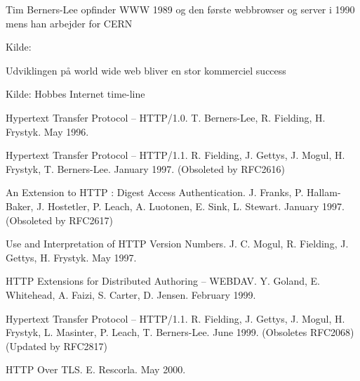 

\begin{list1}
\item Tim Berners-Lee opfinder WWW 1989 og den første webbrowser og
  server i 1990 mens han arbejder for CERN
\end{list1}

Kilde:



\begin{list1}
\item Udviklingen på world wide web bliver en stor kommerciel success
\end{list1}

Kilde: Hobbes Internet time-line\\


\begin{list2}
\item[1945] Hypertext Transfer Protocol -- HTTP/1.0. T. Berners-Lee, R.
     Fielding, H. Frystyk. May 1996.
\item[2068] Hypertext Transfer Protocol -- HTTP/1.1. R. Fielding, J. Gettys,
     J. Mogul, H. Frystyk, T. Berners-Lee. January 1997. (Obsoleted by
     RFC2616)
\item[2069] An Extension to HTTP : Digest Access Authentication. J. Franks,
     P. Hallam-Baker, J. Hostetler, P. Leach, A. Luotonen, E. Sink, L.
     Stewart. January 1997. (Obsoleted by
     RFC2617)
\item[2145] Use and Interpretation of HTTP Version Numbers. J. C. Mogul, R.
     Fielding, J. Gettys, H. Frystyk. May 1997. 
\item[2518] HTTP Extensions for Distributed Authoring -- WEBDAV. Y. Goland,
     E. Whitehead, A. Faizi, S. Carter, D. Jensen. February 1999.
\item[2616] Hypertext Transfer Protocol -- HTTP/1.1. R. Fielding, J. Gettys,
     J. Mogul, H. Frystyk, L. Masinter, P. Leach, T. Berners-Lee. June
     1999. (Obsoletes
     RFC2068) (Updated by RFC2817)
\item[2818] HTTP Over TLS. E. Rescorla. May 2000. 
\end{list2}

